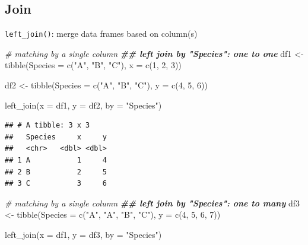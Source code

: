 \documentclass[
]{book}
\newenvironment{Shaded}{\begin{snugshade}}{\end{snugshade}}
\newcommand{\AttributeTok}[1]{\textcolor[rgb]{0.77,0.63,0.00}{#1}}
\newcommand{\CommentTok}[1]{\textcolor[rgb]{0.56,0.35,0.01}{\textit{#1}}}
\newcommand{\DecValTok}[1]{\textcolor[rgb]{0.00,0.00,0.81}{#1}}
\newcommand{\DocumentationTok}[1]{\textcolor[rgb]{0.56,0.35,0.01}{\textbf{\textit{#1}}}}
\newcommand{\FunctionTok}[1]{\textcolor[rgb]{0.00,0.00,0.00}{#1}}
\newcommand{\NormalTok}[1]{#1}
\newcommand{\OtherTok}[1]{\textcolor[rgb]{0.56,0.35,0.01}{#1}}
\newcommand{\StringTok}[1]{\textcolor[rgb]{0.31,0.60,0.02}{#1}}
\begin{document}
\hypertarget{join}{%
\subsection{Join}\label{join}}

\texttt{left\_join()}: merge data frames based on column(s)

\begin{Shaded}
\begin{Highlighting}[]
\CommentTok{\# matching by a single column}
\DocumentationTok{\#\# left join by "Species": one to one}
\NormalTok{df1 }\OtherTok{\textless{}{-}} \FunctionTok{tibble}\NormalTok{(}\AttributeTok{Species =} \FunctionTok{c}\NormalTok{(}\StringTok{"A"}\NormalTok{, }\StringTok{"B"}\NormalTok{, }\StringTok{"C"}\NormalTok{),}
              \AttributeTok{x =} \FunctionTok{c}\NormalTok{(}\DecValTok{1}\NormalTok{, }\DecValTok{2}\NormalTok{, }\DecValTok{3}\NormalTok{))}

\NormalTok{df2 }\OtherTok{\textless{}{-}} \FunctionTok{tibble}\NormalTok{(}\AttributeTok{Species =} \FunctionTok{c}\NormalTok{(}\StringTok{"A"}\NormalTok{, }\StringTok{"B"}\NormalTok{, }\StringTok{"C"}\NormalTok{),}
              \AttributeTok{y =} \FunctionTok{c}\NormalTok{(}\DecValTok{4}\NormalTok{, }\DecValTok{5}\NormalTok{, }\DecValTok{6}\NormalTok{))}

\FunctionTok{left\_join}\NormalTok{(}\AttributeTok{x =}\NormalTok{ df1,}
          \AttributeTok{y =}\NormalTok{ df2,}
          \AttributeTok{by =} \StringTok{"Species"}\NormalTok{)}
\end{Highlighting}
\end{Shaded}

\begin{verbatim}
## # A tibble: 3 x 3
##   Species     x     y
##   <chr>   <dbl> <dbl>
## 1 A           1     4
## 2 B           2     5
## 3 C           3     6
\end{verbatim}

\begin{Shaded}
\begin{Highlighting}[]
\CommentTok{\# matching by a single column}
\DocumentationTok{\#\# left join by "Species": one to many}
\NormalTok{df3 }\OtherTok{\textless{}{-}} \FunctionTok{tibble}\NormalTok{(}\AttributeTok{Species =} \FunctionTok{c}\NormalTok{(}\StringTok{"A"}\NormalTok{, }\StringTok{"A"}\NormalTok{, }\StringTok{"B"}\NormalTok{, }\StringTok{"C"}\NormalTok{),}
              \AttributeTok{y =} \FunctionTok{c}\NormalTok{(}\DecValTok{4}\NormalTok{, }\DecValTok{5}\NormalTok{, }\DecValTok{6}\NormalTok{, }\DecValTok{7}\NormalTok{))}

\FunctionTok{left\_join}\NormalTok{(}\AttributeTok{x =}\NormalTok{ df1,}
          \AttributeTok{y =}\NormalTok{ df3,}
          \AttributeTok{by =} \StringTok{"Species"}\NormalTok{)}
\end{Highlighting}
\end{Shaded}
\end{document}

